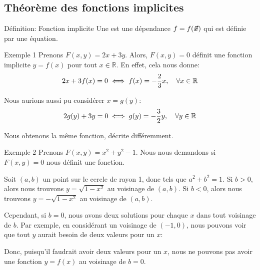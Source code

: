 \documentclass[a4paper]{article}
\begin{document}
\subsection{Théorème des fonctions implicites}
\begin{parag}{Définition: Fonction implicite}
    Une  est une dépendance $f = f\left(\bvec{x}\right)$ qui est définie par une équation.
\end{parag}

\begin{parag}{Exemple 1}
    Prenons $F\left(x, y\right) = 2x + 3y$. Alors, $F\left(x, y\right) = 0$ définit une fonction implicite $y = f\left(x\right)$ pour tout $x \in \mathbb{R}$. En effet, cela nous donne: 
    \[2x + 3f\left(x\right) = 0 \iff f\left(x\right) = -\frac{2}{3} x, \mathspace \forall x \in \mathbb{R}\]
    
    Nous aurions aussi pu considérer $x = g\left(y\right)$: 
    \[2g\left(y\right) + 3y = 0 \iff g\left(y\right) = -\frac{3}{2}y, \mathspace \forall y \in \mathbb{R}\]
    
    Nous obtenons la même fonction, décrite différemment. 
\end{parag}

\begin{parag}{Exemple 2}
    Prenons $F\left(x, y\right) = x^2 + y^2 - 1$. Nous nous demandons si $F\left(x, y\right) = 0$ nous définit une fonction. 

    Soit $\left(a, b\right)$ un point sur le cercle de rayon 1, donc tels que $a^2 + b^2 = 1$. Si $b > 0$, alors nous trouvons $y = \sqrt{1 - x^2}$ au voisinage de $\left(a, b\right)$. Si $b < 0$, alors nous trouvons $y = -\sqrt{1 - x^2}$ au voisinage de $\left(a, b\right)$.

    Cependant, si $b = 0$, nous avons deux solutions pour chaque $x$ dans tout voisinage de $b$. Par exemple, en considérant un voisinage de $\left(-1, 0\right)$, nous pouvons voir que tout $y$ aurait besoin de deux valeurs pour un $x$:

     Donc, puisqu'il faudrait avoir deux valeurs pour un $x$, nous ne pouvons pas avoir une fonction $y = f\left(x\right)$ au voisinage de $b = 0$.
\end{parag}
\end{document}
